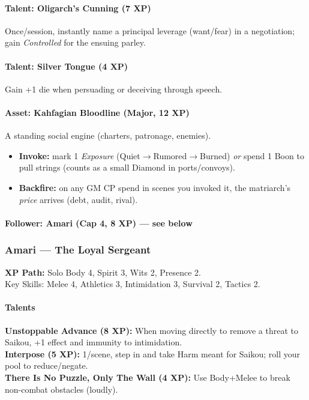 \paragraph{Talent: Oligarch's Cunning (7 XP)}
Once/session, instantly name a principal leverage (want/fear) in a negotiation; gain \emph{Controlled} for the ensuing parley.

\paragraph{Talent: Silver Tongue (4 XP)}
Gain +1 die when persuading or deceiving through speech.

\paragraph{Asset: Kahfagian Bloodline (Major, 12 XP)}
A standing social engine (charters, patronage, enemies).
\begin{itemize}
  \item \textbf{Invoke:} mark 1 \emph{Exposure} (Quiet$\to$Rumored$\to$Burned) \emph{or} spend 1 Boon to pull strings (counts as a small Diamond in ports/convoys).
  \item \textbf{Backfire:} on any GM CP spend in scenes you invoked it, the matriarch's \emph{price} arrives (debt, audit, rival).
\end{itemize}

\paragraph{Follower: Amari (Cap 4, 8 XP) — see below}

\subsubsection{Amari — The Loyal Sergeant}
\textbf{XP Path:} Solo \quad
Body 4, Spirit 3, Wits 2, Presence 2.\\
Key Skills: Melee 4, Athletics 3, Intimidation 3, Survival 2, Tactics 2.

\paragraph{Talents}
\textbf{Unstoppable Advance (8 XP):} When moving directly to remove a threat to Saikou, +1 effect and immunity to intimidation.\\
\textbf{Interpose (5 XP):} 1/scene, step in and take Harm meant for Saikou; roll your pool to reduce/negate.\\
\textbf{There Is No Puzzle, Only The Wall (4 XP):} Use Body+Melee to break non-combat obstacles (loudly).

